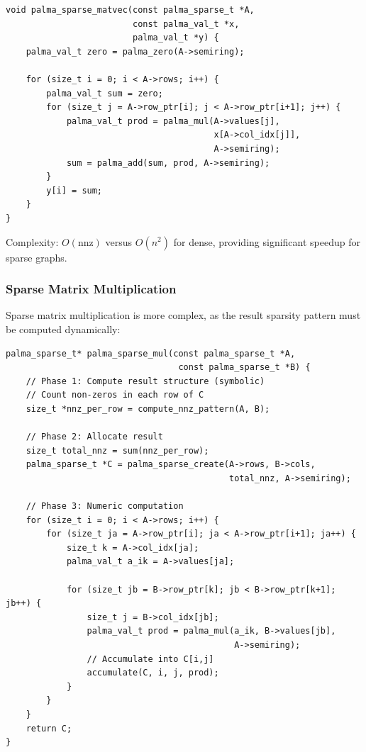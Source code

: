 \documentclass[11pt,a4paper]{article}
\theoremstyle{plain}
\theoremstyle{definition}
\newcommand{\nnz}{\mathrm{nnz}}
\begin{document}
\begin{lstlisting}[caption={Sparse matrix-vector multiplication (CSR)}]
void palma_sparse_matvec(const palma_sparse_t *A,
                         const palma_val_t *x,
                         palma_val_t *y) {
    palma_val_t zero = palma_zero(A->semiring);
    
    for (size_t i = 0; i < A->rows; i++) {
        palma_val_t sum = zero;
        for (size_t j = A->row_ptr[i]; j < A->row_ptr[i+1]; j++) {
            palma_val_t prod = palma_mul(A->values[j], 
                                         x[A->col_idx[j]],
                                         A->semiring);
            sum = palma_add(sum, prod, A->semiring);
        }
        y[i] = sum;
    }
}
\end{lstlisting}

Complexity: $O(\nnz)$ versus $O(n^2)$ for dense, providing significant speedup for sparse graphs.

\subsubsection{Sparse Matrix Multiplication}

Sparse matrix multiplication is more complex, as the result sparsity pattern must be computed dynamically:

\begin{lstlisting}[caption={Sparse matrix multiplication overview}]
palma_sparse_t* palma_sparse_mul(const palma_sparse_t *A,
                                  const palma_sparse_t *B) {
    // Phase 1: Compute result structure (symbolic)
    // Count non-zeros in each row of C
    size_t *nnz_per_row = compute_nnz_pattern(A, B);
    
    // Phase 2: Allocate result
    size_t total_nnz = sum(nnz_per_row);
    palma_sparse_t *C = palma_sparse_create(A->rows, B->cols, 
                                            total_nnz, A->semiring);
    
    // Phase 3: Numeric computation
    for (size_t i = 0; i < A->rows; i++) {
        for (size_t ja = A->row_ptr[i]; ja < A->row_ptr[i+1]; ja++) {
            size_t k = A->col_idx[ja];
            palma_val_t a_ik = A->values[ja];
            
            for (size_t jb = B->row_ptr[k]; jb < B->row_ptr[k+1]; jb++) {
                size_t j = B->col_idx[jb];
                palma_val_t prod = palma_mul(a_ik, B->values[jb], 
                                             A->semiring);
                // Accumulate into C[i,j]
                accumulate(C, i, j, prod);
            }
        }
    }
    return C;
}
\end{lstlisting}
\end{document}
